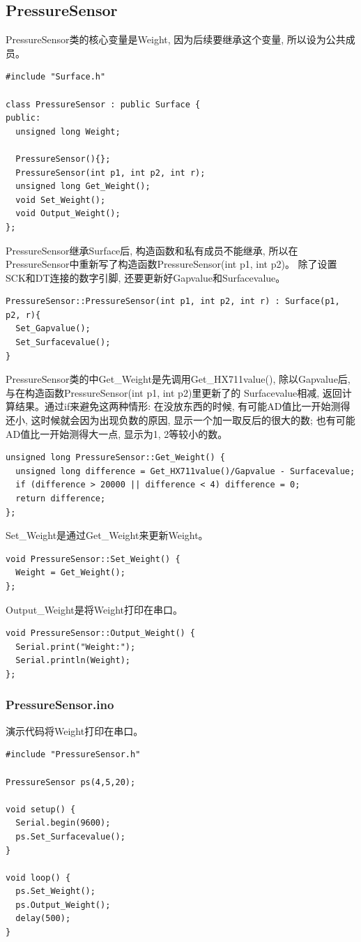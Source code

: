 \documentclass{article}
\begin{document}
\subsection{PressureSensor}
PressureSensor类的核心变量是Weight, 因为后续要继承这个变量, 所以设为公共成员。
\begin{lstlisting}
#include "Surface.h"

class PressureSensor : public Surface {
public:
  unsigned long Weight;

  PressureSensor(){};
  PressureSensor(int p1, int p2, int r);
  unsigned long Get_Weight();
  void Set_Weight();
  void Output_Weight();
}; 
\end{lstlisting}

PressureSensor继承Surface后, 构造函数和私有成员不能继承, 所以在PressureSensor中重新写了构造函数PressureSensor(int p1, int p2)。
除了设置SCK和DT连接的数字引脚, 还要更新好Gapvalue和Surfacevalue。\par
\begin{lstlisting}
PressureSensor::PressureSensor(int p1, int p2, int r) : Surface(p1, p2, r){
  Set_Gapvalue();
  Set_Surfacevalue();	
}
\end{lstlisting}

PressureSensor类的中Get\_Weight是先调用Get\_HX711value(), 除以Gapvalue后, 与在构造函数PressureSensor(int p1, int p2)里更新了的
Surfacevalue相减, 返回计算结果。通过if来避免这两种情形: 在没放东西的时候, 有可能AD值比一开始测得还小, 这时候就会因为出现负数的原因, 
显示一个加一取反后的很大的数; 也有可能AD值比一开始测得大一点, 显示为1, 2等较小的数。
\begin{lstlisting}
unsigned long PressureSensor::Get_Weight() {
  unsigned long difference = Get_HX711value()/Gapvalue - Surfacevalue;
  if (difference > 20000 || difference < 4) difference = 0;			
  return difference;
};
\end{lstlisting}

Set\_Weight是通过Get\_Weight来更新Weight。
\begin{lstlisting}
void PressureSensor::Set_Weight() {
  Weight = Get_Weight();
};
\end{lstlisting}

Output\_Weight是将Weight打印在串口。
\begin{lstlisting}
void PressureSensor::Output_Weight() {
  Serial.print("Weight:");
  Serial.println(Weight);
};
\end{lstlisting}

\subsubsection{PressureSensor.ino}
演示代码将Weight打印在串口。
\begin{lstlisting}
#include "PressureSensor.h"

PressureSensor ps(4,5,20);

void setup() {
  Serial.begin(9600);
  ps.Set_Surfacevalue();
}

void loop() {
  ps.Set_Weight();
  ps.Output_Weight();
  delay(500);
}
\end{lstlisting}
\end{document}
